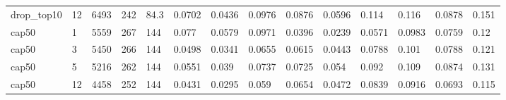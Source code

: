\begin{tabular}{llllllllllllll}
drop\_top10 & 12 & 6493 & 242 & 84.3 & 0.0702 & 0.0436 & 0.0976 & 0.0876 & 0.0596 & 0.114 & 0.116 & 0.0878 & 0.151 \\
cap50 & 1 & 5559 & 267 & 144 & 0.077 & 0.0579 & 0.0971 & 0.0396 & 0.0239 & 0.0571 & 0.0983 & 0.0759 & 0.12 \\
cap50 & 3 & 5450 & 266 & 144 & 0.0498 & 0.0341 & 0.0655 & 0.0615 & 0.0443 & 0.0788 & 0.101 & 0.0788 & 0.121 \\
cap50 & 5 & 5216 & 262 & 144 & 0.0551 & 0.039 & 0.0737 & 0.0725 & 0.054 & 0.092 & 0.109 & 0.0874 & 0.131 \\
cap50 & 12 & 4458 & 252 & 144 & 0.0431 & 0.0295 & 0.059 & 0.0654 & 0.0472 & 0.0839 & 0.0916 & 0.0693 & 0.115 \\
\bottomrule
\end{tabular}